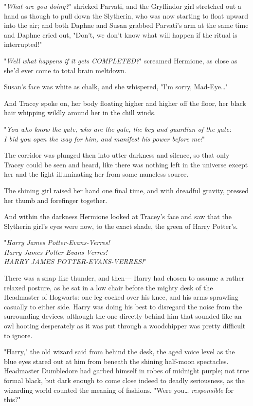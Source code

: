 "\emph{What are you doing?}" shrieked Parvati, and the Gryffindor girl 
stretched out a hand as though to pull down the Slytherin, who was now starting 
to float upward into the air; and both Daphne and Susan grabbed Parvati's arm 
at the same time and Daphne cried out, "Don't, we don't know what will happen 
if the ritual is interrupted!"

"\emph{Well what happens if it gets COMPLETED?}" screamed Hermione, as close as 
she'd ever come to total brain meltdown.

Susan's face was white as chalk, and she whispered, "I'm sorry, Mad-Eye{\ldots}"

And Tracey spoke on, her body floating higher and higher off the floor, her 
black hair whipping wildly around her in the chill winds.

"\emph{You who know the gate, who are the gate, the key and guardian of the 
gate:\\
I bid you open the way for him, and manifest his power before me!}"

The corridor was plunged then into utter darkness and silence, so that only 
Tracey could be seen and heard, like there was nothing left in the universe 
except her and the light illuminating her from some nameless source.

The shining girl raised her hand one final time, and with dreadful gravity, 
pressed her thumb and forefinger together.

And within the darkness Hermione looked at Tracey's face and saw that the 
Slytherin girl's eyes were now, to the exact shade, the green of Harry Potter's.

"\emph{Harry James Potter-Evans-Verres!\\
Harry James Potter-Evans-Verres!\\
HARRY JAMES POTTER-EVANS-VERRES!}"

There was a snap like thunder, and then---
\sbreak
Harry had chosen to assume a rather relaxed posture, as he sat in a low chair 
before the mighty desk of the Headmaster of Hogwarts: one leg cocked over his 
knee, and his arms sprawling casually to either side. Harry was doing his best 
to disregard the noise from the surrounding devices, although the one directly 
behind him that sounded like an owl hooting desperately as it was put through a 
woodchipper was pretty difficult to ignore.

"Harry," the old wizard said from behind the desk, the aged voice level as the 
blue eyes stared out at him from beneath the shining half-moon spectacles. 
Headmaster Dumbledore had garbed himself in robes of midnight purple; not true 
formal black, but dark enough to come close indeed to deadly seriousness, as 
the wizarding world counted the meaning of fashions. "Were you{\ldots} 
\emph{responsible} for this?"

